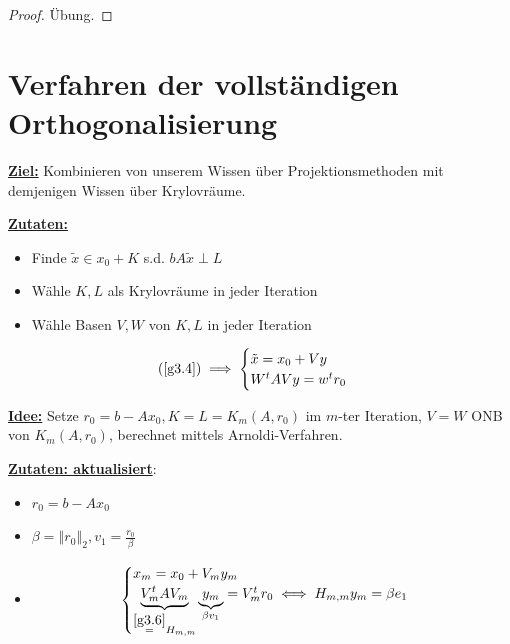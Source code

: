 \documentclass{book}
\begin{document}
            \begin{proof}
                Übung.
            \end{proof}

        \section{Verfahren der vollständigen Orthogonalisierung}

            \underline{\textbf{Ziel:}} Kombinieren von unserem Wissen über Projektionsmethoden mit demjenigen 
            Wissen über Krylovräume.

            \underline{\textbf{Zutaten:}}
            \begin{itemize}
                \item Finde $\tilde{x}\in x_0+K$ s.d. $bA\tilde{x}\perp L$
                \item Wähle $K,L$ als Krylovräume in jeder Iteration
                \item Wähle Basen $V,W$ von $K,L$ in jeder Iteration
            \end{itemize}

            \[
                (\ref{g3.4}) \implies \begin{cases}
                    \tilde{x}=x_0+Vy\\
                    W^t A Vy = w^tr_0
                \end{cases}    
            \]

            \underline{\textbf{Idee:}} Setze $r_0=b-Ax_0,K=L=K_m(A,r_0)$ im $m$-ter Iteration, 
            $V=W$ ONB von $K_m(A,r_0)$, berechnet mittels Arnoldi-Verfahren.   

            \underline{\textbf{Zutaten: aktualisiert}}:
            \begin{itemize}
                \item $r_0=b-Ax_0$
                \item $\beta=\left\Vert r_0 \right\Vert_2,v_1=\frac{r_0}{\beta}$
                \item \[
                  \begin{cases}
                    x_m=x_0+V_my_m\\
                    \underbrace{V_m^t AV_m}_{\stackrel{\ref{g3.6}}{=}H_{m,m}}\underbrace{y_m}_{\beta v_1} = V_m^t r_0 \iff H_{m,m}y_m=\beta e_1
                  \end{cases}  
                \]
            \end{itemize}
\end{document}
